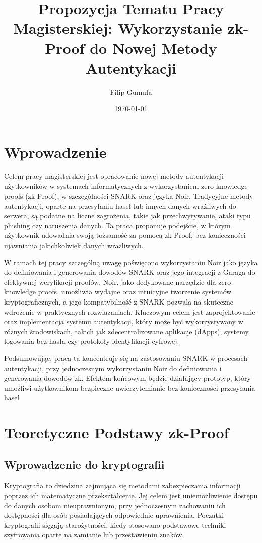 \documentclass{article}
\title{Propozycja Tematu Pracy Magisterskiej: Wykorzystanie zk-Proof do Nowej Metody Autentykacji}
\author{Filip Gumuła}
\date{\today}
\begin{document}
\maketitle
\newpage
\tableofcontents 
\newpage

\section{Wprowadzenie}
Celem pracy magisterskiej jest opracowanie nowej metody autentykacji użytkowników w systemach informatycznych z wykorzystaniem zero-knowledge proofs (zk-Proof), 
w szczególności SNARK oraz języka Noir. Tradycyjne metody autentykacji, oparte na przesyłaniu haseł lub innych danych wrażliwych do serwera, są podatne na liczne zagrożenia, 
takie jak przechwytywanie, ataki typu phishing czy naruszenia danych. Ta praca proponuje podejście, 
w którym użytkownik udowadnia swoją tożsamość za pomocą zk-Proof, bez konieczności ujawniania jakichkolwiek danych wrażliwych.

W ramach tej pracy szczególną uwagę poświęcono wykorzystaniu Noir jako języka do definiowania i generowania dowodów SNARK oraz jego integracji z 
Garaga do efektywnej weryfikacji proofów. Noir, jako dedykowane narzędzie dla zero-knowledge proofs, 
umożliwia wydajne oraz intuicyjne tworzenie systemów kryptograficznych, a jego kompatybilność z SNARK 
pozwala na skuteczne wdrożenie w praktycznych rozwiązaniach. Kluczowym celem jest zaprojektowanie oraz implementacja systemu autentykacji, 
który może być wykorzystywany w różnych środowiskach, takich jak zdecentralizowane aplikacje (dApps), systemy logowania bez hasła czy protokoły identyfikacji cyfrowej.

Podsumowując, praca ta koncentruje się na zastosowaniu SNARK w procesach autentykacji, przy jednoczesnym wykorzystaniu Noir do definiowania i generowania dowodów zk. 
Efektem końcowym będzie działający prototyp, który umożliwi użytkownikom bezpieczne uwierzytelnianie bez konieczności przesyłania haseł

\newpage
\section{Teoretyczne Podstawy zk-Proof}

\subsection{Wprowadzenie do kryptografii}
Kryptografia to dziedzina zajmująca się metodami zabezpieczania informacji poprzez ich matematyczne przekształcenie. 
Jej celem jest uniemożliwienie dostępu do danych osobom nieuprawnionym, przy jednoczesnym zachowaniu ich dostępności dla osób posiadających odpowiednie uprawnienia. 
Początki kryptografii sięgają starożytności, kiedy stosowano podstawowe techniki szyfrowania oparte na zamianie lub przestawieniu znaków.
\end{document}
